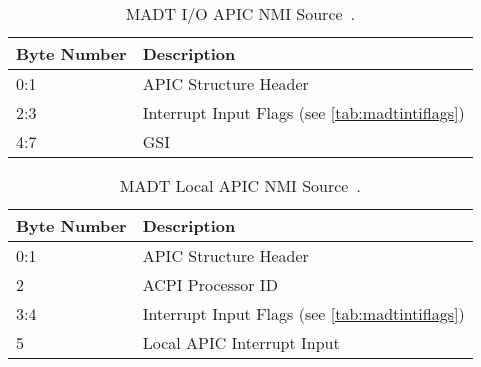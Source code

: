 \begin{table}[H]
  \centering
  \begin{tabularx}{1.0\textwidth}{| X | X |}
    \hline
    \textbf{Byte Number} & \textbf{Description}                                    \\ \hline\hline
    0:1                  & APIC Structure Header                                   \\ \hline
    2:3                  & Interrupt Input Flags (see \autoref{tab:madtintiflags}) \\ \hline
    4:7                  & GSI
  \end{tabularx}
  \caption{MADT I/O APIC NMI Source~\cite[sec.~5.2.8.3.2]{acpi1}.}
  \label{tab:madtionmi}
\end{table}

\begin{table}[H]
  \centering
  \begin{tabularx}{1.0\textwidth}{| X | X |}
    \hline
    \textbf{Byte Number} & \textbf{Description}                                    \\ \hline\hline
    0:1                  & APIC Structure Header                                   \\ \hline
    2                    & ACPI Processor ID                                       \\ \hline
    3:4                  & Interrupt Input Flags (see \autoref{tab:madtintiflags}) \\ \hline
    5                    & Local APIC Interrupt Input                              \\ \hline
  \end{tabularx}
  \caption{MADT Local APIC NMI Source~\cite[sec.~5.2.8.3.3]{acpi1}.}
  \label{tab:madtlnmi}
\end{table}
